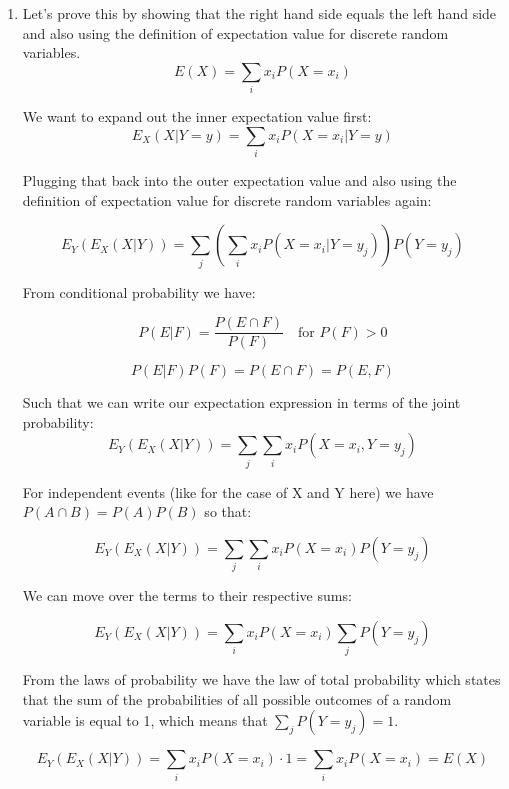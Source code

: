 \documentclass[10pt]{article}
\begin{document}
\begin{enumerate}[label=(\alph*)]
	\item Let's prove this by showing that the right hand side equals the left hand side and also using the definition of expectation value for discrete random variables.
	      \begin{equation*}
		      E(X) = \sum_{i} x_i P(X=x_i)
	      \end{equation*}

	      We want to expand out the inner expectation value first:
	      \begin{equation*}
		      E_{X}(X|Y=y) = \sum_{i} x_i P(X=x_i|Y=y)
	      \end{equation*}


	      Plugging that back into the outer expectation value and also using the definition of expectation value for discrete random variables again:

	      \begin{equation*}
		      E_{Y}(E_{X}(X|Y)) = \sum_{j} \left( \sum_{i} x_i P(X=x_i|Y=y_j) \right) P(Y=y_j)
	      \end{equation*}

	      From conditional probability we have:

	      \[
		      P(E|F) = \frac{P(E \cap F)}{P(F)} \quad \text{for } P(F) > 0
	      \]

	      \[ P(E|F) P(F) = P(E \cap F) = P(E,F) \]

	      Such that we can write our expectation expression in terms of the joint probability:
	      \[ E_{Y}(E_{X}(X|Y)) = \sum_{j} \sum_{i} x_i P(X=x_i, Y=y_j) \]

	      For independent events (like for the case of X and Y here) we have $P(A \cap B) = P(A)P(B)$ so that:

	      \[ E_{Y}(E_{X}(X|Y)) = \sum_{j} \sum_{i} x_i P(X=x_i) P(Y=y_j) \]

	      We can move over the terms to their respective sums:

	      \[ E_{Y}(E_{X}(X|Y)) = \sum_{i} x_i P(X=x_i) \sum_{j} P(Y=y_j) \]

	      From the laws of probability we have the law of total probability which states that the sum of the probabilities of all possible outcomes of a random variable is equal to 1, which means that $\sum_{j} P(Y=y_j) = 1$.

	      \[ \boxed{E_{Y}(E_{X}(X|Y)) = \sum_{i} x_i P(X=x_i) \cdot 1 = \sum_{i} x_i P(X=x_i) = E(X) }\]


\end{enumerate}
\end{document}
